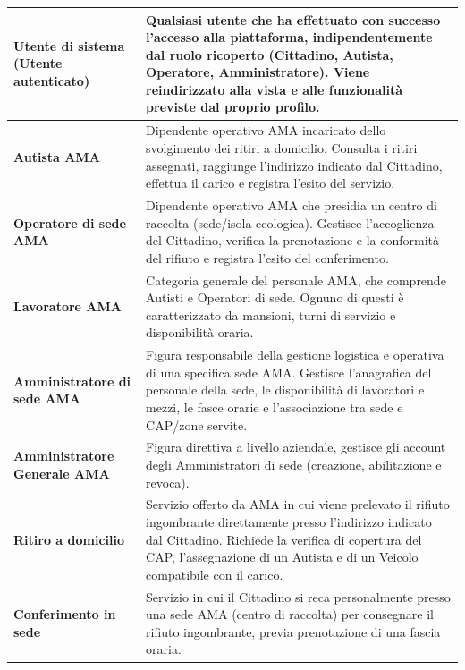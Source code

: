 \begin{center}
\begin{longtable}{|p{4.2cm}|p{10.5cm}|}
\textbf{Utente di sistema (Utente autenticato)} & Qualsiasi utente che ha effettuato con successo l'accesso alla piattaforma, indipendentemente dal ruolo ricoperto (Cittadino, Autista, Operatore, Amministratore). Viene reindirizzato alla vista e alle funzionalità previste dal proprio profilo. \\ \hline

\textbf{Autista AMA} & Dipendente operativo AMA incaricato dello svolgimento dei ritiri a domicilio. Consulta i ritiri assegnati, raggiunge l'indirizzo indicato dal Cittadino, effettua il carico e registra l'esito del servizio. \\ \hline

\textbf{Operatore di sede AMA} & Dipendente operativo AMA che presidia un centro di raccolta (sede/isola ecologica). Gestisce l'accoglienza del Cittadino, verifica la prenotazione e la conformità del rifiuto e registra l'esito del conferimento. \\ \hline

\textbf{Lavoratore AMA} & Categoria generale del personale AMA, che comprende Autisti e Operatori di sede. Ognuno di questi è caratterizzato da mansioni, turni di servizio e disponibilità oraria. \\ \hline

\textbf{Amministratore di sede AMA} & Figura responsabile della gestione logistica e operativa di una specifica sede AMA. Gestisce l'anagrafica del personale della sede, le disponibilità di lavoratori e mezzi, le fasce orarie e l'associazione tra sede e CAP/zone servite. \\ \hline

\textbf{Amministratore Generale AMA} & Figura direttiva a livello aziendale, gestisce gli account degli Amministratori di sede (creazione, abilitazione e revoca). \\ \hline

\textbf{Ritiro a domicilio} & Servizio offerto da AMA in cui viene prelevato il rifiuto ingombrante direttamente presso l’indirizzo indicato dal Cittadino. Richiede la verifica di copertura del CAP, l’assegnazione di un Autista e di un Veicolo compatibile con il carico. \\ \hline

\textbf{Conferimento in sede} & Servizio in cui il Cittadino si reca personalmente presso una sede AMA (centro di raccolta) per consegnare il rifiuto ingombrante, previa prenotazione di una fascia oraria. \\ \hline


\end{longtable}
\end{center}
